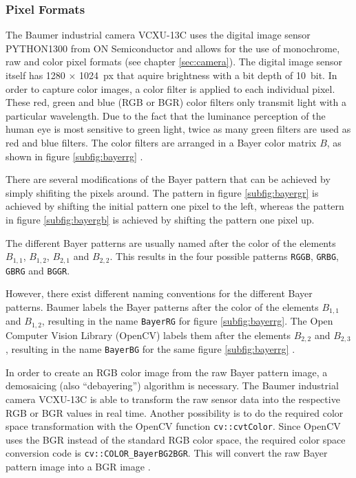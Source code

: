 \subsubsection{Pixel Formats}
\label{subsubsec:pixel_format}

The Baumer industrial camera VCXU-13C uses the digital image sensor PYTHON1300 from ON Semiconductor and allows for the use of monochrome, raw and color pixel formats (see chapter \ref{sec:camera}).
The digital image sensor itself has 1280 $\times$ \SI{1024}{px} that aquire brightness with a bit depth of \SI{10}{bit}.
In order to capture color images, a color filter is applied to each individual pixel.
These red, green and blue (RGB or BGR) color filters only transmit light with a particular wavelength.
Due to the fact that the luminance perception of the human eye is most sensitive to green light, twice as many green filters are used as red and blue filters.
The color filters are arranged in a Bayer color matrix $B$, as shown in figure \ref{subfig:bayerrg} \cite{dcs}.

There are several modifications of the Bayer pattern that can be achieved by simply shifiting the pixels around.
The pattern in figure \ref{subfig:bayergr} is achieved by shifting the initial pattern one pixel to the left, whereas the pattern in figure \ref{subfig:bayergb} is achieved by shifting the pattern one pixel up.

The different Bayer patterns are usually named after the color of the elements $B_{1,1}$, $B_{1,2}$, $B_{2,1}$ and $B_{2,2}$.
This results in the four possible patterns \texttt{RGGB}, \texttt{GRBG}, \texttt{GBRG} and \texttt{BGGR}.

However, there exist different naming conventions for the different Bayer patterns.
Baumer labels the Bayer patterns after the color of the elements $B_{1,1}$ and $B_{1,2}$, resulting in the name \texttt{BayerRG} for figure \ref{subfig:bayerrg}.
The Open Computer Vision Library (OpenCV) labels them after the elements $B_{2,2}$ and $B_{2,3}$, resulting in the name \texttt{BayerBG} for the same figure \ref{subfig:bayerrg} \cite{baumer_opencv}.

In order to create an RGB color image from the raw Bayer pattern image, a demosaicing (also ``debayering'') algorithm is necessary.
The Baumer industrial camera VCXU-13C is able to transform the raw sensor data into the respective RGB or BGR values in real time.
Another possibility is to do the required color space transformation with the OpenCV function \texttt{cv::cvtColor}.
Since OpenCV uses the BGR instead of the standard RGB color space, the required color space conversion code is \texttt{cv::COLOR\_BayerBG2BGR}.
This will convert the raw Bayer pattern image into a BGR image \cite{opencv_csc}.

